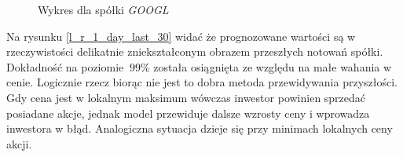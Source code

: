 \documentclass[a4paper, twoside, 11pt, openright]{article}
\begin{document}
\begin{figure}[H]%
\centering
{}%
\qquad
{}%
\caption{Wykres dla spółki \textit{GOOGL}}
\label{linear_regression_1}
\end{figure}


Na rysunku \ref{l_r_1_day_last_30} widać że prognozowane wartości są w rzeczywistości delikatnie zniekształconym obrazem przeszłych notowań spółki. Dokładność na poziomie $~99\%$ została osiągnięta ze względu na małe wahania w cenie. Logicznie rzecz biorąc nie jest to dobra metoda przewidywania przyszłości. Gdy cena jest w lokalnym maksimum wówczas inwestor powinien sprzedać posiadane akcje, jednak model przewiduje dalsze wzrosty ceny i wprowadza inwestora w błąd. Analogiczna sytuacja dzieje się przy minimach lokalnych ceny akcji. 
\end{document}
